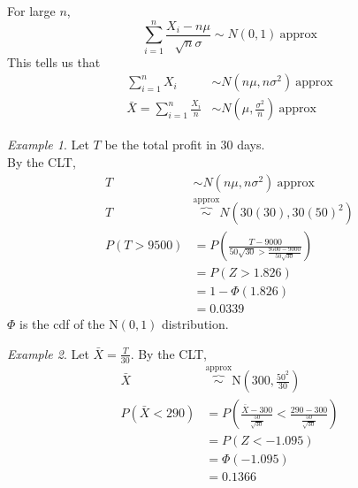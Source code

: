 \documentclass{article}
\theoremstyle{definition}
\theoremstyle{remark}
\theoremstyle{example}
\newtheorem*{example}{Example}
\begin{document}
	For large $n$, \[ \sum_{i=1}^{n} \frac{X_i - n \mu}{\sqrt{n}\sigma} \sim N(0,1)\ \mathrm{approx} \]
	This tells us that
	\begin{align*}
		\sum_{i=1}^{n} X_i & \sim N(n \mu, n \sigma^2)\ \mathrm{approx}\\
		\bar{X} = \sum_{i=1}^{n}\frac{X_i}{n} & \sim N\left(\mu, \frac{\sigma^2}{n}\right) \ \mathrm{approx}
	\end{align*}
	
	\begin{example}
		Let $T$ be the total profit in 30 days.\\
		By the CLT, 
		\begin{align*}
			T &\sim N(n \mu, n \sigma^2)\ \mathrm{approx}\\
			T & \overbrace{\sim}^\mathrm{approx} N(30(30), 30(50)^2)\\
			P(T>9500)&= P\left( \frac{T-9000}{50\sqrt{30} > \frac{9500-9000}{50\sqrt{30}}} \right)\\
			&= P(Z > 1.826)\\
			&= 1-\Phi(1.826)\\
			&=0.0339
		\end{align*}
		$\Phi$ is the cdf of the N$(0,1)$ distribution.
	\end{example}

	\begin{example}
		Let $\bar{X}=\frac{T}{30}$. By the CLT, \begin{align*}
			\bar{X} &\overbrace{\sim}^{\mathrm{approx}}\mathrm{N}\left(300,\frac{50^2}{30}\right)\\
			P(\bar{X}<290)&=P\left( \frac{\bar{X}-300}{\frac{50}{\sqrt{30}}} < \frac{290-300}{\frac{50}{\sqrt{30}}} \right)\\
			&= P(Z<-1.095)\\
			&= \Phi(-1.095)\\
			&= 0.1366
		\end{align*}
	\end{example}
\end{document}
